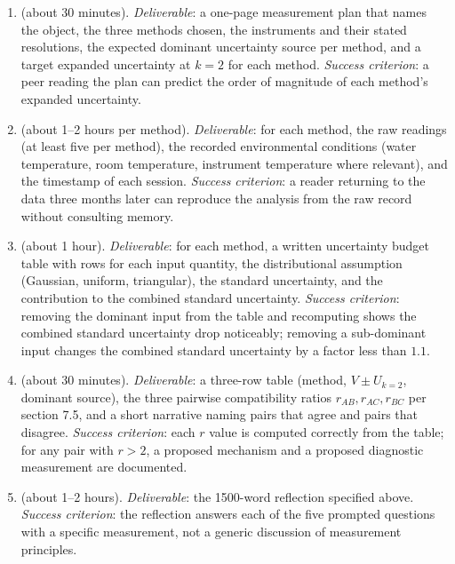 \begin{project}
\begin{enumerate}[leftmargin=*]
  \item {} (about 30 minutes).
    \textit{Deliverable}: a one-page measurement plan that names the
    object, the three methods chosen, the instruments and their
    stated resolutions, the expected dominant uncertainty source per
    method, and a target expanded uncertainty at $k = 2$ for each
    method.
    \textit{Success criterion}: a peer reading the plan can predict
    the order of magnitude of each method's expanded uncertainty.
  \item {} (about 1--2 hours per
    method). \textit{Deliverable}: for each method, the raw readings
    (at least five per method), the recorded environmental
    conditions (water temperature, room temperature, instrument
    temperature where relevant), and the timestamp of each session.
    \textit{Success criterion}: a reader returning to the data three
    months later can reproduce the analysis from the raw record
    without consulting memory.
  \item {} (about 1 hour).
    \textit{Deliverable}: for each method, a written uncertainty
    budget table with rows for each input quantity, the
    distributional assumption (Gaussian, uniform, triangular), the
    standard uncertainty, and the contribution to the combined
    standard uncertainty.
    \textit{Success criterion}: removing the dominant input from the
    table and recomputing shows the combined standard uncertainty
    drop noticeably; removing a sub-dominant input changes the
    combined standard uncertainty by a factor less than $1.1$.
  \item {} (about 30 minutes).
    \textit{Deliverable}: a three-row table (method, $V \pm U_{k=2}$,
    dominant source), the three pairwise compatibility ratios
    $r_{AB}, r_{AC}, r_{BC}$ per section 7.5, and a short narrative
    naming pairs that agree and pairs that disagree.
    \textit{Success criterion}: each $r$ value is computed correctly
    from the table; for any pair with $r > 2$, a proposed mechanism
    and a proposed diagnostic measurement are documented.
  \item {} (about 1--2 hours).
    \textit{Deliverable}: the 1500-word reflection specified above.
    \textit{Success criterion}: the reflection answers each of the
    five prompted questions with a specific measurement, not a
    generic discussion of measurement principles.
\end{enumerate}


\end{project}
